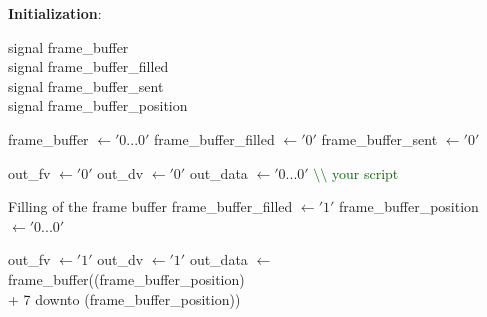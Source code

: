 \documentclass[12pt,a4paper]{article}
\begin{document}
\begin{algorithm}[H]
 \vspace{0.1cm}
 \textbf{Initialization}: ~\\\vspace{0.2cm}
 {\footnotesize 
 signal frame\_buffer \\
 signal frame\_buffer\_filled \\
 signal frame\_buffer\_sent \\
 signal frame\_buffer\_position \\
 \vspace{0.2cm}

 	{
    \vspace{0.2cm}
   	frame\_buffer $\leftarrow '0...0'$\;
 	frame\_buffer\_filled $\leftarrow '0'$\;
 	frame\_buffer\_sent $\leftarrow '0'$\;
 	\vspace{0.2cm}
  	}
	{
	\vspace{0.2cm}
	out\_fv $\leftarrow '0'$\;	
	out\_dv $\leftarrow '0'$\; 	
	out\_data $\leftarrow '0...0'$\;
	\vspace{0.2cm}
 		{
 		\vspace{0.2cm}
		\textcolor{darkgreen}{$\setminus\setminus$ your script}
		\vspace{0.2cm}
  		}
		{
		\vspace{0.2cm}
			{
			\vspace{0.2cm}
			{
			\vspace{0.2cm}
			\textcolor{newgrey}{Filling of the frame buffer\;} \vspace{0.05cm}
			frame\_buffer\_filled $\leftarrow '1'$\;
			frame\_buffer\_position $\leftarrow '0...0'$\;
			\vspace{0.2cm}
			}			
			
			}
			{
			\vspace{0.2cm}
			out\_fv $\leftarrow '1'$\;	
			out\_dv $\leftarrow '1'$\; 	
			out\_data $\leftarrow$ frame\_buffer((frame\_buffer\_position)\\
			\qquad \qquad \qquad + 7 downto (frame\_buffer\_position))\;
			\vspace{0.2cm}

}}}}
\end{algorithm}
\end{document}

